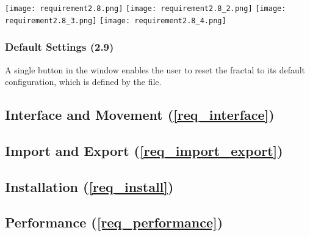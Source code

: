 \FloatBarrier
\begin{figure*}[htp]
	\centering
	\texttt{[image: requirement2.8.png]}
	\texttt{[image: requirement2.8\_2.png]}
	\texttt{[image: requirement2.8\_3.png]}
	\texttt{[image: requirement2.8\_4.png]}
\end{figure*}
\FloatBarrier

\subsubsection{Default Settings (2.9)}

A single button in the  window enables the user to reset the fractal to its default configuration, which is defined by the  file.

\subsection{Interface and Movement (\ref{req_interface})}

\subsection{Import and Export (\ref{req_import_export})}
	
\subsection{Installation (\ref{req_install})}

\subsection{Performance (\ref{req_performance})}
		
